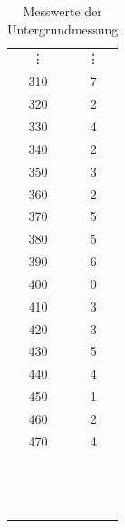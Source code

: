 \documentclass{article}
\begin{document}
\begin{table}[!p]
\begin{minipage}{0.47\textwidth}
\begin{tabular}{cc}
        \vdots & \vdots \\
        310 &      7 \\
        320 &      2 \\
        330 &      4 \\
        340 &      2 \\
        350 &      3 \\
        360 &      2 \\
        370 &      5 \\
        380 &      5 \\
        390 &      6 \\
        400 &      0 \\
        410 &      3 \\
        420 &      3 \\
        430 &      5 \\
        440 &      4 \\
        450 &      1 \\
        460 &      2 \\
        470 &      4 \\ 
        \phantom{.} & \\
        \phantom{.} & \\
        \phantom{.} & \\
        \phantom{.} & \\
        \phantom{.} & \\
        \phantom{.} & \\
        \phantom{.} & \\
        \phantom{.} & \\
        \phantom{.} & \\
        \phantom{.} & \\
        \phantom{.} & \\
        \phantom{.} & \\
        \phantom{.} & \\
        \phantom{.} & \\
\hline
\end{tabular}%
\end{minipage} \hfill
\caption{Messwerte der Untergrundmessung}
\end{table}
\end{document}

